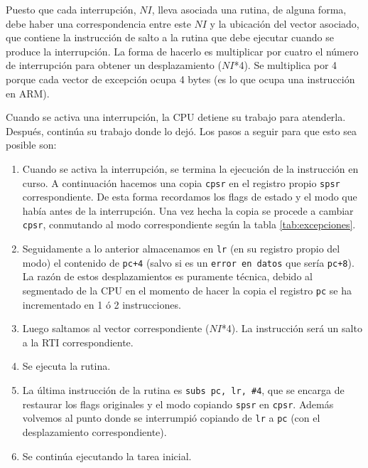 Puesto que cada interrupción, $NI$, lleva asociada una rutina, de
alguna forma, debe haber una correspondencia entre este $NI$
y la ubicación del vector asociado, que contiene la instrucción de salto a la rutina que debe
ejecutar cuando se produce la interrupción. La forma de hacerlo es multiplicar por
cuatro el número de interrupción para obtener un desplazamiento
($NI$*4). Se multiplica por 4 porque cada vector de excepción
ocupa 4 bytes (es lo que ocupa una instrucción en ARM).

Cuando se activa una interrupción, la CPU detiene su trabajo para
atenderla. Después, continúa su trabajo donde lo dejó. Los pasos a
seguir para que esto sea posible son:

\begin{enumerate}
  \item Cuando se activa la interrupción, se termina la ejecución de la
    instrucción en curso. A continuación hacemos una copia {\tt cpsr} en el registro
    propio {\tt spsr} correspondiente. De esta forma recordamos los flags de estado
    y el modo que había antes de la interrupción. Una vez hecha la copia se
    procede a cambiar {\tt cpsr}, conmutando al modo correspondiente
    según la tabla \ref{tab:excepciones}.

  \item Seguidamente a lo anterior almacenamos en {\tt lr} (en su registro propio del modo)
    el contenido de {\tt pc+4} (salvo si es un {\tt error en datos} que sería
    {\tt pc+8}). La razón de estos
    desplazamientos es puramente técnica, debido al segmentado de la CPU en
    el momento de hacer la copia el registro {\tt pc} se ha incrementado en 1 ó
    2 instrucciones.

  \item Luego saltamos al vector correspondiente ($NI$*4). La instrucción será un salto
    a la RTI correspondiente.

  \item Se ejecuta la rutina.

  \item La última instrucción de la rutina es {\tt subs pc, lr, \#4}, que se encarga
    de restaurar los flags originales y el modo copiando {\tt spsr} en {\tt cpsr}.
    Además volvemos al punto donde se interrumpió copiando de {\tt lr} a {\tt pc} (con el
    desplazamiento correspondiente).

   \item Se continúa ejecutando la tarea inicial.
\end{enumerate}

